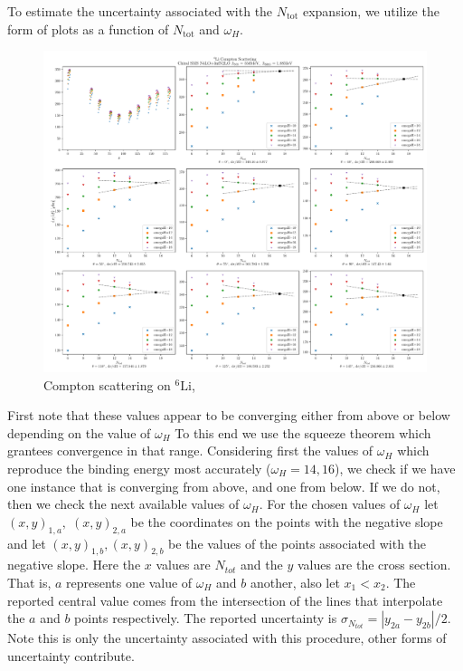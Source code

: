 \documentclass[12pt]{article}
\newcommand{\Ntot}{N_{\mathrm{tot}}}
\newcommand{\LiS}{{}^{6} \mathrm{Li} }
\newcommand{\3}{\ss}
\numberwithin{equation}{section}
\begin{document}
To estimate the uncertainty associated with the $\Ntot$ expansion, we utilize the form of 
plots as a function of $\Ntot$ and $\omega_H$.
\begin{figure}[H]
\centering
\includegraphics[width=\linewidth]{NtotmaxConverge-Lam550-SRG188.pdf}
\caption{Compton scattering on $\LiS$,}
\label{fig:Ntotuncer}
\end{figure}
First note that these values appear to be converging either from above or below depending on the value of $\omega_H$
To this end we use the squeeze theorem which grantees convergence in that range.
Considering first the values of $\omega_H$ which reproduce the binding energy most accurately ($\omega_H=14,16$), we check if we have one instance that is converging from above, and one from below.
If we do not, then we check the next available values of $\omega_H$. 
For the chosen values of $\omega_H$ let $(x, y)_{1,a},\;(x,y)_{2,a}$ be the coordinates on the points with the negative slope 
and let $(x, y)_{1,b}, (x,y)_{2,b}$ be the values of the points associated with the negative slope. Here the $x$ values are $N_{tot}$ and the $y$ values are the cross section. That is, $a$ represents one value of $\omega_H$ and $b$ another, also let $x_1<x_2$.
The reported central value comes from the intersection of the lines that interpolate the $a$ and $b$ points respectively.
The reported uncertainty is $\sigma_{N_{tot}}=|y_{2a}-y_{2b}|/2$.
Note this is only the uncertainty associated with this procedure, other forms of uncertainty contribute.
\end{document}
